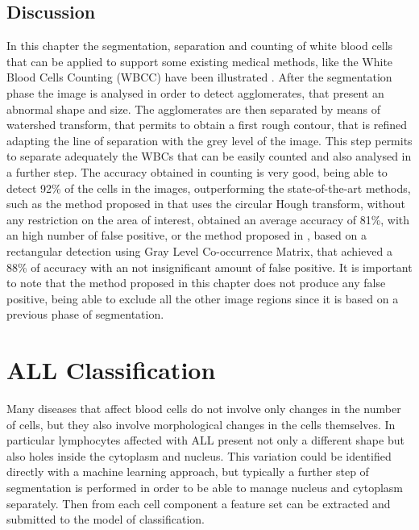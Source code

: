 \documentclass[final,a4paper,12pt,english]{UnicaPhdThesis3}
\begin{document}
\section{Discussion}
In this chapter the segmentation, separation and counting of white blood cells that can be applied to support some existing medical methods, like the White Blood Cells Counting (\acs{WBCC}) have been illustrated . After the segmentation phase the image is analysed in order to detect agglomerates, that present an abnormal shape and size. The agglomerates are then separated by means of watershed transform, that permits to obtain a first rough contour, that is refined adapting the line of separation with the grey level of the image. This step permits to separate adequately the WBCs that can be easily counted and also analysed in a further step. The accuracy obtained in counting is very good, being able to detect 92\% of the cells in the images, outperforming the state-of-the-art methods, such as the method proposed in \cite{Mahmood} that uses the circular Hough transform, without any restriction on the area of interest, obtained an average accuracy of 81\%, with an high number of false positive, or the method proposed in \cite{Alilou}, based on a rectangular detection using Gray Level Co-occurrence Matrix, that achieved a 88\% of accuracy with an not insignificant amount of false positive. It is important to note that the method proposed in this chapter does not produce any false positive, being able to exclude all the other image regions since it is based on a previous phase of segmentation. 

\chapter{ALL Classification}
Many diseases that affect blood cells do not involve only changes in the number of cells, but they also involve morphological changes in the cells themselves. In particular lymphocytes affected with ALL present not only a different shape but also holes inside the cytoplasm and nucleus. This variation could be identified directly with a machine learning approach, but typically a further step of segmentation is performed in order to be able to manage nucleus and cytoplasm separately. Then from each cell component a feature set can be extracted and submitted to the model of classification. 
\end{document}
